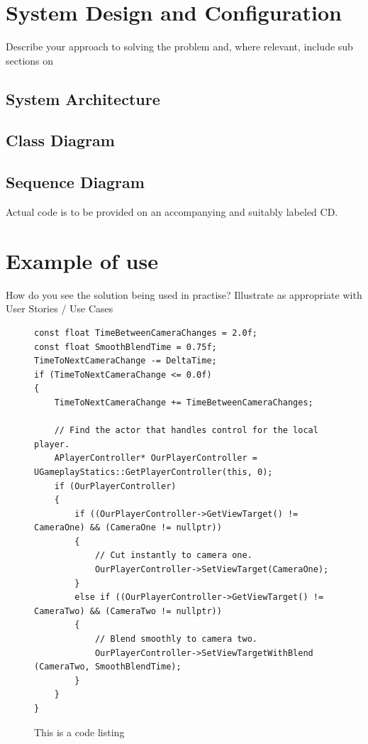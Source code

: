 \documentclass[12pt,a4paper,titlepage]{article}
\begin{document}
\section{System Design and Configuration}
Describe your approach to solving the problem and, where relevant, include sub sections on

\subsection{System Architecture}

\subsection{Class Diagram}

\subsection{Sequence Diagram}

Actual code is to be provided on an accompanying and suitably labeled CD.

\section{Example of use}
How do you see the solution being used in practise? Illustrate as appropriate with User Stories / Use Cases 

\begin{figure}[H]
\begin{lstlisting}
const float TimeBetweenCameraChanges = 2.0f;
const float SmoothBlendTime = 0.75f;
TimeToNextCameraChange -= DeltaTime;
if (TimeToNextCameraChange <= 0.0f)
{
    TimeToNextCameraChange += TimeBetweenCameraChanges;

    // Find the actor that handles control for the local player.
    APlayerController* OurPlayerController = UGameplayStatics::GetPlayerController(this, 0);
    if (OurPlayerController)
    {
        if ((OurPlayerController->GetViewTarget() != CameraOne) && (CameraOne != nullptr))
        {
            // Cut instantly to camera one.
            OurPlayerController->SetViewTarget(CameraOne);
        }
        else if ((OurPlayerController->GetViewTarget() != CameraTwo) && (CameraTwo != nullptr))
        {
            // Blend smoothly to camera two.
            OurPlayerController->SetViewTargetWithBlend (CameraTwo, SmoothBlendTime);
        }
    }
}
\end{lstlisting}
	\caption{This is a code listing}
	\label{code:raig header file}
\end{figure}
\end{document}
